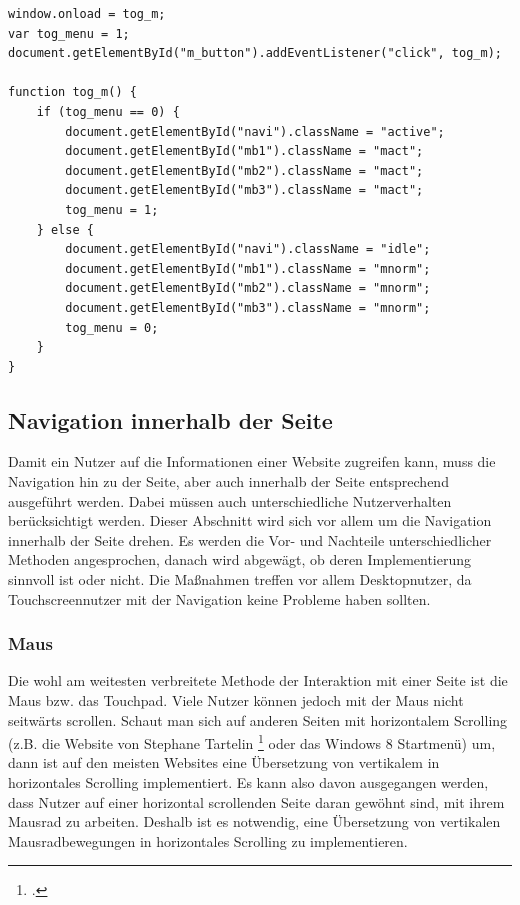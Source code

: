  \begin{lstlisting}[caption=Die Funktion tog\_m() öffnet bzw. schließt das Menü., label=js_menuevent]
window.onload = tog_m;
var tog_menu = 1;
document.getElementById("m_button").addEventListener("click", tog_m);

function tog_m() {
	if (tog_menu == 0) {
		document.getElementById("navi").className = "active";
		document.getElementById("mb1").className = "mact";
		document.getElementById("mb2").className = "mact";
		document.getElementById("mb3").className = "mact";
		tog_menu = 1;
	} else {
		document.getElementById("navi").className = "idle";
		document.getElementById("mb1").className = "mnorm";
		document.getElementById("mb2").className = "mnorm";
		document.getElementById("mb3").className = "mnorm";
		tog_menu = 0;
	}
}
\end{lstlisting} 

\subsection{Navigation innerhalb der Seite}
Damit ein Nutzer auf die Informationen einer Website zugreifen kann, muss die Navigation hin zu der Seite, aber auch innerhalb der Seite entsprechend ausgeführt werden. Dabei müssen auch unterschiedliche Nutzerverhalten berücksichtigt werden. Dieser Abschnitt wird sich vor allem um die Navigation innerhalb der Seite drehen. Es werden die Vor- und Nachteile unterschiedlicher Methoden angesprochen, danach wird abgewägt, ob deren Implementierung sinnvoll ist oder nicht.
Die Maßnahmen treffen vor allem Desktopnutzer, da Touchscreennutzer mit der Navigation keine Probleme haben sollten.
\subsubsection{Maus}
Die wohl am weitesten verbreitete Methode der Interaktion mit einer Seite ist die Maus bzw. das Touchpad. Viele Nutzer können jedoch mit der Maus nicht seitwärts scrollen. Schaut man sich auf anderen Seiten mit horizontalem Scrolling (z.B. die Website von Stephane Tartelin
\footcite[zu finden auf:][]{tartelin} oder das Windows 8 Startmenü) um, dann ist auf den meisten Websites eine Übersetzung von vertikalem in horizontales Scrolling implementiert. Es kann also davon ausgegangen werden, dass Nutzer auf einer horizontal scrollenden Seite daran gewöhnt sind, mit ihrem Mausrad zu arbeiten. Deshalb ist es notwendig, eine Übersetzung von vertikalen Mausradbewegungen in horizontales Scrolling zu implementieren. 
	
